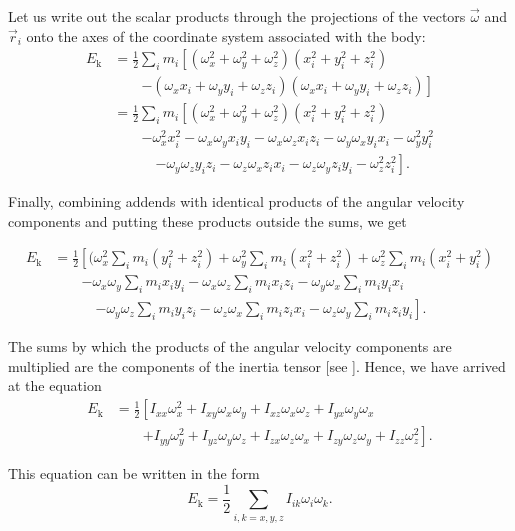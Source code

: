 \noindent
Let us write out the scalar products through the projections of the vectors $\vec{\omega}$ and $\vec{r}_i$ onto the axes of the coordinate system associated with the body:
\begin{align*}
	E_{\text{k}} &= \frac{1}{2}\sum_i m_i \left[(\omega_x^2+\omega_y^2+\omega_z^2)(x_i^2+y_i^2+z_i^2) \right.\\
	&\quad\quad\left. - (\omega_x x_i+\omega_y y_i+\omega_z z_i)(\omega_x x_i+\omega_y y_i+\omega_z z_i)\right]\\
	&= \frac{1}{2}\sum_i m_i \left[(\omega_x^2+\omega_y^2+\omega_z^2)(x_i^2+y_i^2+z_i^2)  \right.\\
	&\quad\quad\left. -\omega_x^2x_i^2 - \omega_x\omega_yx_iy_i - \omega_x\omega_zx_iz_i - \omega_y\omega_xy_ix_i - \omega_y^2y_i^2   \right.\\
	&\quad\quad\quad\left. - \omega_y\omega_zy_iz_i - \omega_z\omega_xz_ix_i - \omega_z\omega_yz_iy_i - \omega_z^2z_i^2\right].
\end{align*}

\noindent
Finally, combining addends with identical products of the angular velocity components and putting these products outside the sums, we get

\begin{align*}
	E_{\text{k}} &= \frac{1}{2}\left[(\omega_x^2 \sum_i m_i (y_i^2+z_i^2) + \omega_y^2 \sum_i m_i (x_i^2+z_i^2) + \omega_z^2 \sum_i m_i (x_i^2+y_i^2) \right.\\
	&\quad\quad\left. - \omega_x\omega_y \sum_i m_ix_iy_i - \omega_x\omega_z \sum_i m_i x_iz_i - \omega_y\omega_x \sum_i m_i y_ix_i \right.\\
	&\quad\quad\quad\left. -\omega_y\omega_z \sum_i m_i y_iz_i - \omega_z\omega_x \sum_i m_i z_ix_i - \omega_z\omega_y \sum_i m_i z_iy_i\right].
\end{align*}

The sums by which the products of the angular velocity components are multiplied are the components of the inertia tensor [see ]. Hence, we have arrived at the equation
\begin{align}
	E_{\text{k}} &= \frac{1}{2}\left[I_{xx}\omega_x^2 + I_{xy}\omega_x\omega_y + I_{xz}\omega_x\omega_z + I_{yx}\omega_y\omega_x \right.\nonumber\\
	&\quad\quad\left. + I_{yy}\omega_y^2 + I_{yz}\omega_y\omega_z + I_{zx}\omega_z\omega_x + I_{zy}\omega_z\omega_y + I_{zz}\omega_z^2\right].\label{eq:5_50} 
\end{align}

\noindent
This equation can be written in the form
\begin{equation}\label{eq:5_51}
	E_{\text{k}} = \frac{1}{2}\sum_{i,k=x,y,z} I_{ik}\omega_i\omega_k.
\end{equation}

